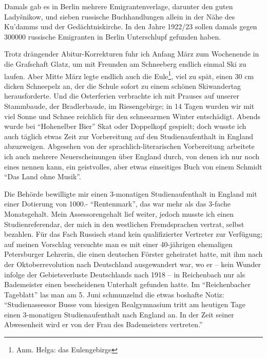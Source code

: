 \documentclass[a5paper,pagesize,10pt,twoside=true]{scrbook}
\renewcommand{\marginpar}[2][]{}
\begin{document}
Damals gab es in Berlin mehrere Emigrantenverlage, darunter den guten Ladyšnikow, und sieben russische Buchhandlungen allein in der Nähe des Ku'damms und der Gedächtniskirche. In den Jahre 1922/23 sollen damals gegen \num{300000} russische Emigranten in Berlin Unterschlupf gefunden haben.

\marginpar{454}
Trotz drängender Abitur-Korrekturen fuhr ich Anfang März zum Wochenende in die Grafschaft Glatz, um mit Freunden am Schneeberg endlich einmal Ski zu laufen. Aber Mitte März legte endlich auch die Eule\footnote{Anm. Helga: das Eulengebirge}, viel zu spät, einen 30 cm dicken Schneepelz an, der die Schule sofort zu einem schönen Skiwandertag herausforderte. Und die Osterferien verbrachte ich mit Prauses auf unserer Stammbaude, der Bradlerbaude, im Riesengebirge; in 14 Tagen wurden wir mit viel Sonne und Schnee reichlich für den schneearmen Winter entschädigt. Abends wurde bei \enquote{Hohenelber Bier} Skat oder Doppelkopf gespielt; doch wusste ich auch täglich etwas Zeit zur Vorbereitung auf den Studienaufenthalt in England abzuzweigen. Abgesehen von der sprachlich-literarischen Vorbereitung arbeitete ich auch mehrere Neuerscheinungen über England durch, von denen ich nur noch eines nennen kann, ein geistvolles, aber etwas einseitiges Buch von einem Schmidt \enquote{Das Land ohne Musik}.

Die Behörde bewilligte mir einen 3-monatigen Studienaufenthalt in England mit einer Dotierung von \num{1000}.- \enquote{Rentenmark}, das war mehr als das 3-fache Monatsgehalt. Mein Assessorengehalt lief weiter, jedoch musste ich einen Studienreferendar, der mich in den westlichen Fremdsprachen vertrat, selbst bezahlen. Für das Fach Russisch stand kein qualifizierter Vertreter zur Verfügung; auf meinen Vorschlag versuchte man es mit einer 40-jährigen ehemaligen Petersburger Lehrerin, die einen deutschen Förster geheiratet hatte, mit ihm nach der Oktoberrevolution nach Deutschland ausgewandert war, wo er -- kein Wunder infolge der Gebietsverluste Deutschlands nach 1918 -- in Reichenbach nur als Bademeister einen bescheidenen Unterhalt gefunden hatte. Im \enquote{Reichenbacher Tageblatt} las man am 5. Juni schmunzelnd die etwas boshafte Notiz: \enquote{Studienassessor Busse vom hiesigen Realgymnasium tritt am heutigen Tage einen 3-monatigen Studienaufenthalt nach England an. In der Zeit seiner Abwesenheit wird er von der Frau des Bademeisters vertreten.}\\

\marginpar{495 (Vati schrieb das 10/9/74)}
\end{document}
